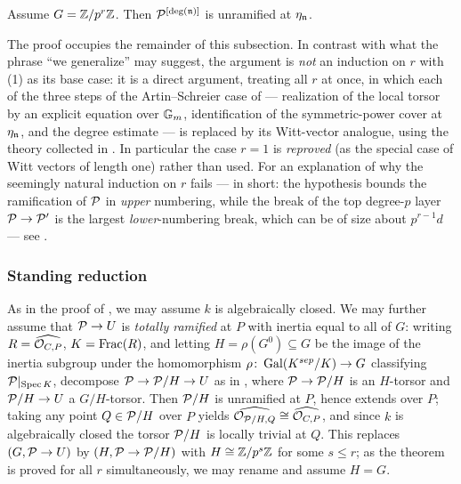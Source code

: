 \begin{theorem}\label{theorem:ramification_after_blowup_is_tame_for_p_power:reorg}
    Assume $G=\mathbb{Z}/p^r\mathbb{Z}$. Then $\mathcal{P}^{[\deg (\mathfrak{n})]}$ is unramified at $\eta_{\mathfrak{n}}$.
\end{theorem}

The proof occupies the remainder of this subsection. In contrast with what the phrase
``we generalize'' may suggest, the argument is \emph{not} an induction on $r$ with
(1) as its base case: it is a direct
argument, treating all $r$ at once, in which each of the three steps of the
Artin--Schreier case of  --- realization of
the local torsor by an explicit equation over $\mathbb{G}_m$, identification of the
symmetric-power cover at $\eta_{\mathfrak{n}}$, and the degree estimate --- is replaced by its
Witt-vector analogue, using the theory collected in
. In particular the case $r=1$ is
\emph{reproved} (as the special case of Witt vectors of length one) rather than used.
For an explanation of why the seemingly natural induction on $r$ fails --- in short:
the hypothesis bounds the ramification of $\mathcal{P}$ in \emph{upper} numbering, while the
break of the top degree-$p$ layer $\mathcal{P} \to \mathcal{P}'$ is the largest \emph{lower}-numbering
break, which can be of size about $p^{r-1}d$ --- see .

\subsubsection*{Standing reduction}

As in the proof of , we may assume $k$ is
algebraically closed. We may further assume that $\mathcal{P} \to U$ is \emph{totally
ramified} at $P$ with inertia equal to all of $G$: writing
$R = \widehat{\mathcal{O}_{C,P}}$, $K = \operatorname{Frac}(R)$, and letting
$H = \rho(G^0) \subseteq G$ be the image of the inertia subgroup under the
homomorphism $\rho \colon \operatorname{Gal}(K^{sep}/K) \to G$ classifying $\mathcal{P}|_{\operatorname{Spec} K}$,
decompose $\mathcal{P} \to \mathcal{P}/H \to U$ as in , where
$\mathcal{P} \to \mathcal{P}/H$ is an $H$-torsor and $\mathcal{P}/H \to U$ a $G/H$-torsor. Then
$\mathcal{P}/H$ is unramified at $P$, hence extends over $P$; taking any point
$Q \in \mathcal{P}/H$ over $P$ yields $\widehat{\mathcal{O}_{\mathcal{P}/H, Q}} \cong \widehat{\mathcal{O}_{C,P}}$,
and since $k$ is algebraically closed the torsor $\mathcal{P}/H$ is locally trivial at
$Q$. This replaces $(G, \mathcal{P} \to U)$ by $(H, \mathcal{P} \to \mathcal{P}/H)$ with
$H \cong \mathbb{Z}/p^s\mathbb{Z}$ for some $s \leq r$; as the theorem is proved for all $r$
simultaneously, we may rename and assume $H = G$.

